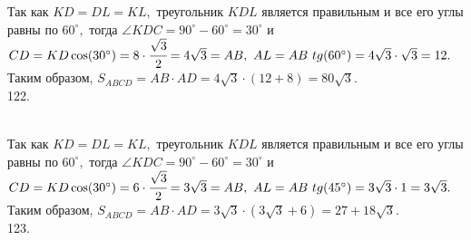 \documentclass[12pt]{article}
\begin{document}
Так как $KD=DL=KL,$ треугольник $KDL$ является правильным и все его углы равны по $60^\circ,$ тогда $\angle KDC=90^\circ-60^\circ=30^\circ$ и $CD=KD\cos(30^\circ)=8\cdot\cfrac{\sqrt{3}}{2}=4\sqrt{3}=AB,\ AL=AB\ tg(60^\circ)=4\sqrt{3}\cdot\sqrt{3}=12.$ Таким образом, $S_{ABCD}=AB\cdot AD=4\sqrt{3}\cdot(12+8)=80\sqrt{3}.$\\
122. \begin{figure}[ht!]
\end{figure}\\
Так как $KD=DL=KL,$ треугольник $KDL$ является правильным и все его углы равны по $60^\circ,$ тогда $\angle KDC=90^\circ-60^\circ=30^\circ$ и $CD=KD\cos(30^\circ)=6\cdot\cfrac{\sqrt{3}}{2}=3\sqrt{3}=AB,\ AL=AB\ tg(45^\circ)=3\sqrt{3}\cdot1=3\sqrt{3}.$ Таким образом, $S_{ABCD}=AB\cdot AD=3\sqrt{3}\cdot(3\sqrt{3}+6)=27+18\sqrt{3}.$\\
123. \begin{figure}[ht!]
\end{figure}\\
\end{document}
